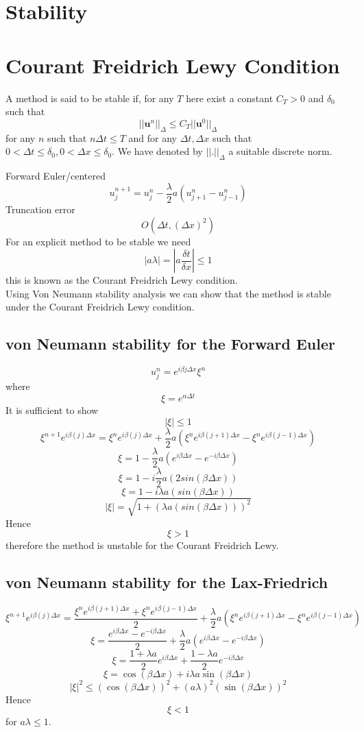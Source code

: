 \section{Stability}
\section{Courant Freidrich Lewy Condition}
A method is said to be stable if, for any $T$ here exist a constant $C_T>0$
and $\delta_0$ such that
\[|| \mathbf{u}^n ||_{\Delta}\leq C_T ||\mathbf{u}^0||_{\Delta} \]
for any $n$ such that $n\Delta t \leq T$ and for any $\Delta t, \Delta x$ such that $0 < \Delta t \leq \delta_0,0 < \Delta x \leq \delta_0$. We have denoted by
$ 
|| . ||_{\Delta}$ a suitable discrete norm.

Forward Euler/centered
\[ u^{n+1}_j=u^{n}_{j}-\frac{\lambda}{2}a(u^{n}_{j+1}-u^{n}_{j-1})\]
Truncation error
\[O(\Delta t , (\Delta x)^2) \]
For an explicit method to be stable we need
\[|a\lambda| = \left|a\frac{\delta t}{\delta x}\right| \leq 1 \]
this is known as the Courant Freidrich Lewy condition.\\
Using  Von Neumann stability analysis we can show that the method is stable
under the Courant Freidrich Lewy condition.\\

\subsection{von Neumann stability for the Forward Euler}
\[u_j^n = e^{i\beta j \Delta x} \xi^n \]
where 
\[\xi = e^{\alpha \Delta t}  \]
It is sufficient to show 
\[|\xi| \leq 1 \]
\[ \xi^{n+1}e^{i\beta(j)\Delta x}=\xi^{n}e^{i\beta(j)\Delta x}+\frac{\lambda}{2}a(\xi^{n}e^{i\beta(j+1)\Delta x}-\xi^{n}e^{i\beta(j-1)\Delta x})\]
\[ \xi = 1-\frac{\lambda}{2}a(e^{i\beta\Delta x}-e^{-i\beta\Delta x})\]
\[ \xi = 1-i\frac{\lambda}{2}a(2sin(\beta \Delta x)) \]
\[ \xi = 1-i\lambda a(sin(\beta \Delta x)) \]
\[ |\xi| = \sqrt{1+(\lambda a(sin(\beta \Delta x)))^2} \]
Hence
\[ \xi>1\]
therefore the method is unstable for the Courant Freidrich Lewy.

\subsection{von Neumann stability for the Lax-Friedrich}


\[ \xi^{n+1}e^{i\beta(j)\Delta x}=\frac{\xi^{n}e^{i\beta(j+1)\Delta x}+\xi^{n}e^{i\beta(j-1)\Delta x}}{2}+\frac{\lambda}{2}a(\xi^{n}e^{i\beta(j+1)\Delta x}-\xi^{n}e^{i\beta(j-1)\Delta x})\]
\[ \xi = \frac{e^{i\beta\Delta x}-e^{-i\beta\Delta x}}{2}+\frac{\lambda}{2}a(e^{i\beta\Delta x}-e^{-i\beta\Delta x})\]
\[ \xi = \frac{1+\lambda a}{2}e^{i\beta\Delta x}+\frac{1-\lambda a}{2}e^{-i\beta\Delta x} \]
\[ \xi = \cos(\beta \Delta x)+i\lambda a\sin(\beta \Delta x) \]
\[ |\xi|^2 \leq (\cos(\beta \Delta x))^2+(a \lambda)^2(\sin(\beta \Delta x))^2 \]
Hence
\[ \xi<1\]
for $a \lambda \leq 1$.